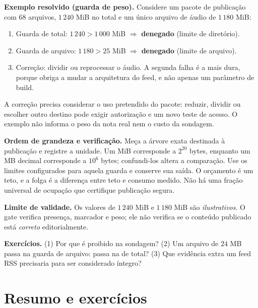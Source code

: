 \begin{resultado}
\textbf{Exemplo resolvido (guarda de peso).} Considere um pacote de publicação com
$68$ arquivos, $1\,240$ MiB no total e um único arquivo de áudio de $1\,180$ MiB:
\begin{enumerate}[leftmargin=1.4em,itemsep=1pt]
  \item Guarda de total: $1\,240 > 1\,000$ MiB $\Rightarrow$ \textbf{denegado} (limite de diretório).
  \item Guarda de arquivo: $1\,180 > 25$ MiB $\Rightarrow$ \textbf{denegado} (limite de arquivo).
  \item Correção: dividir ou reprocessar o áudio. A segunda falha é a mais dura, porque obriga a mudar a arquitetura do feed, e não apenas um parâmetro de build.
\end{enumerate}
A correção precisa considerar o uso pretendido do pacote: reduzir, dividir
ou escolher outro destino pode exigir autorização e um novo teste de acesso.
O exemplo não informa o peso da nota real nem o custo da sondagem.
\end{resultado}

\begin{resultado}
\textbf{Ordem de grandeza e verificação.} Meça a árvore exata destinada à
publicação e registre a unidade. Um MiB corresponde a $2^{20}$ bytes, enquanto
um MB decimal corresponde a $10^6$ bytes; confundi-los altera a comparação.
Use os limites configurados para aquela guarda e conserve sua saída. O
orçamento é um teto, e a folga é a diferença entre teto e consumo medido. Não
há uma fração universal de ocupação que certifique publicação segura.
\end{resultado}

\begin{aviso}
\textbf{Limite de validade.} Os valores de $1\,240$ MiB e $1\,180$ MiB são
\emph{ilustrativos}. O gate verifica presença, marcador e peso; ele não verifica
se o conteúdo publicado está \emph{correto} editorialmente.
\end{aviso}

\begin{resultado}
\textbf{Exercícios.} (1) Por que  é proibido na sondagem? (2) Um
arquivo de $24$ MB passa na guarda de arquivo: passa na de total? (3) Que
evidência extra um feed RSS precisaria para ser considerado íntegro?
\end{resultado}

\section{Resumo e exercícios}

